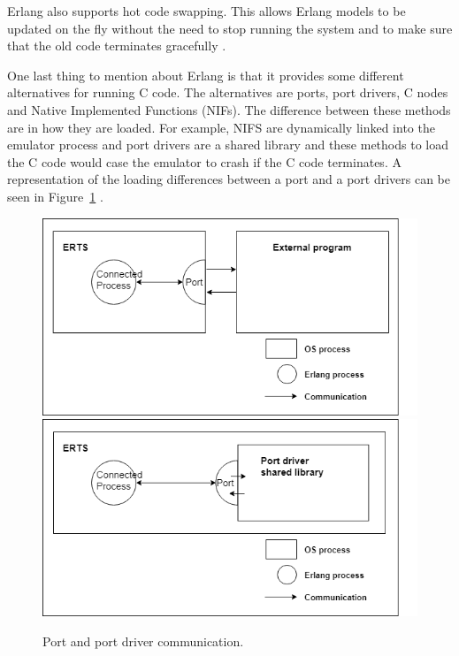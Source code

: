 Erlang also supports hot code swapping. This allows Erlang models to be updated on the fly without the need to stop running the system and to make sure that the old code terminates gracefully \citep{sivieri2012erlang}.

One last thing to mention about Erlang is that it provides some different alternatives for running C code. The alternatives are ports, port drivers, C nodes and Native Implemented Functions (NIFs). The difference between these methods are in how they are loaded. For example, NIFS are dynamically linked into the emulator process and port drivers are a shared library and these methods to load the C code would case the emulator to crash if the C code terminates. A representation of the loading differences between a port and a port drivers can be seen in Figure~\ref{fig:erlang_run_ccode} \citep{ericsson_ab_2019}. 

\begin{figure}[H]
\centering
\includegraphics[scale=0.5]{figure/erlang_port.png}
\includegraphics[scale=0.5]{figure/erlang_port_driver.png}
\caption{Port and port driver communication.}
\label{fig:erlang_run_ccode}
\end{figure}

